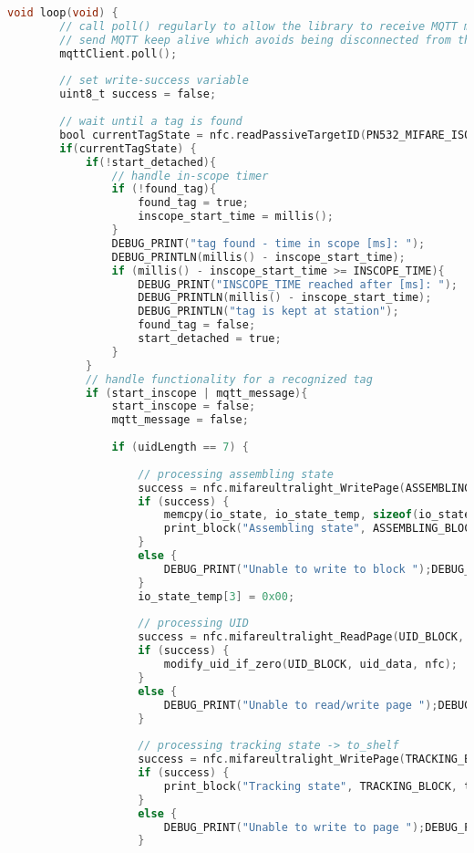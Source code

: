 \begin{lstlisting}[language=C, caption = {Arduino-Loop-Funktion des ESP8266 an der Werkerassistenzstation. Vollständiger Code: \href{https://github.com/KilianRoeper/Studienarbeit/blob/main/NodeMCU/assembling/assembling.ino}{GitHub.com}},label=lst:assembling_loop]
	void loop(void) {
		// call poll() regularly to allow the library to receive MQTT messages and
		// send MQTT keep alive which avoids being disconnected from the broker
		mqttClient.poll();
		
		// set write-success variable
		uint8_t success = false;
		
		// wait until a tag is found
		bool currentTagState = nfc.readPassiveTargetID(PN532_MIFARE_ISO14443A, uid, &uidLength);
		if(currentTagState) {
			if(!start_detached){
				// handle in-scope timer
				if (!found_tag){
					found_tag = true;
					inscope_start_time = millis();
				}
				DEBUG_PRINT("tag found - time in scope [ms]: ");
				DEBUG_PRINTLN(millis() - inscope_start_time);
				if (millis() - inscope_start_time >= INSCOPE_TIME){
					DEBUG_PRINT("INSCOPE_TIME reached after [ms]: ");
					DEBUG_PRINTLN(millis() - inscope_start_time);
					DEBUG_PRINTLN("tag is kept at station");
					found_tag = false;
					start_detached = true;
				}
			}
			// handle functionality for a recognized tag
			if (start_inscope | mqtt_message){
				start_inscope = false;
				mqtt_message = false;
				
				if (uidLength == 7) {
					
					// processing assembling state
					success = nfc.mifareultralight_WritePage(ASSEMBLING_BLOCK, io_state_temp);
					if (success) {
						memcpy(io_state, io_state_temp, sizeof(io_state_temp));
						print_block("Assembling state", ASSEMBLING_BLOCK, io_state, nfc);
					}
					else {
						DEBUG_PRINT("Unable to write to block ");DEBUG_PRINTLN(ASSEMBLING_BLOCK);
					}
					io_state_temp[3] = 0x00;
					
					// processing UID
					success = nfc.mifareultralight_ReadPage(UID_BLOCK, uid_data);
					if (success) {
						modify_uid_if_zero(UID_BLOCK, uid_data, nfc);
					}
					else {
						DEBUG_PRINT("Unable to read/write page ");DEBUG_PRINTLN(UID_BLOCK);
					}
					
					// processing tracking state -> to_shelf
					success = nfc.mifareultralight_WritePage(TRACKING_BLOCK, to_tracking_data);
					if (success) {
						print_block("Tracking state", TRACKING_BLOCK, to_tracking_data, nfc);
					}
					else {
						DEBUG_PRINT("Unable to write to page ");DEBUG_PRINTLN(TRACKING_BLOCK);
					}
					

\end{lstlisting}
